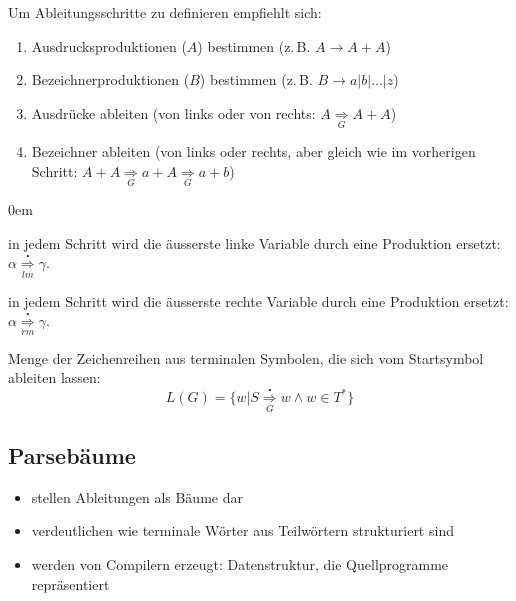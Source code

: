 Um Ableitungsschritte zu definieren empfiehlt sich:
\begin{enumerate}\itemsep0em
	\item Ausdrucksproduktionen ($A$) bestimmen (z.\,B. $A \rightarrow A + A$)
	\item Bezeichnerproduktionen ($B$) bestimmen (z.\,B. $B \rightarrow a|b|\dots|z$)
	\item Ausdrücke ableiten (von links oder von rechts: $A \underset{G}{\Rightarrow} A + A$) 
	\item Bezeichner ableiten (von links oder rechts, aber gleich wie im vorherigen Schritt: $A + A \underset{G}{\Rightarrow} a + A \underset{G}{\Rightarrow} a + b$)
\end{enumerate}

\begin{description}\itemsep0em
	\item [Linksseitige Ableitung] in jedem Schritt wird die äusserste linke Variable durch eine Produktion ersetzt: $\alpha \overset{\centerdot}{\underset{lm}{\Rightarrow}} \gamma$.
	\item [Rechtsseitige Ableitung] in jedem Schritt wird die äusserste rechte
	Variable durch eine Produktion ersetzt: $\alpha \overset{\centerdot}{\underset{rm}{\Rightarrow}} \gamma$.
	\item[Sprache der kfG] Menge der Zeichenreihen aus terminalen Symbolen,
	die sich vom Startsymbol ableiten lassen:
	\begin{equation*}
		L(G) = \{w | S \overset{\centerdot}{\underset{G}{\Rightarrow}} w \wedge w \in T^*\}
	\end{equation*}
\end{description} 

\subsection{Parsebäume}
\begin{itemize}
	\item stellen Ableitungen als Bäume dar
	\item verdeutlichen wie terminale Wörter aus Teilwörtern strukturiert sind
	\item werden von Compilern erzeugt: Datenstruktur, die Quellprogramme repräsentiert
\end{itemize}


